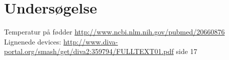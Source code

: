\chapter{Undersøgelse}
Temperatur på fødder \url{http://www.ncbi.nlm.nih.gov/pubmed/20660876}\\

Lignenede devices: \url{http://www.diva-portal.org/smash/get/diva2:359794/FULLTEXT01.pdf} side 17\\